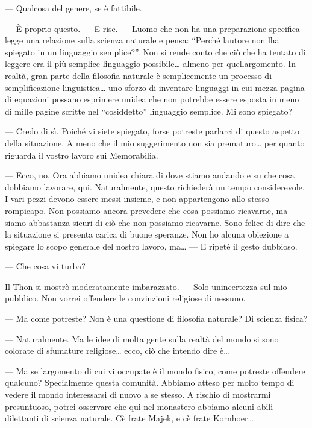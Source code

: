 --- Qualcosa del genere, se è fattibile.

--- È proprio questo. --- E rise. --- L\textquotesingle uomo che non ha
una preparazione specifica legge una relazione sulla scienza naturale e
pensa: ``Perché l\textquotesingle autore non l\textquotesingle ha
spiegato in un linguaggio semplice?''. Non si rende conto che ciò che ha
tentato di leggere era il più semplice linguaggio possibile\ldots{}
almeno per quell\textquotesingle argomento. In realtà, gran parte della
filosofia naturale è semplicemente un processo di semplificazione
linguistica\ldots{} uno sforzo di inventare linguaggi in cui mezza
pagina di equazioni possano esprimere un\textquotesingle idea che non
potrebbe essere esposta in meno di mille pagine scritte nel
``cosiddetto'' linguaggio semplice. Mi sono spiegato?

--- Credo di sì. Poiché vi siete spiegato, forse potreste parlarci di
questo aspetto della situazione. A meno che il mio suggerimento non sia
prematuro\ldots{} per quanto riguarda il vostro lavoro sui Memorabilia.

--- Ecco, no. Ora abbiamo un\textquotesingle idea chiara di dove stiamo
andando e su che cosa dobbiamo lavorare, qui. Naturalmente, questo
richiederà un tempo considerevole. I vari pezzi devono essere messi
insieme, e non appartengono allo stesso rompicapo. Non possiamo ancora
prevedere che cosa possiamo ricavarne, ma siamo abbastanza sicuri di ciò
che non possiamo ricavarne. Sono felice di dire che la situazione si
presenta carica di buone speranze. Non ho alcuna obiezione a spiegare lo
scopo generale del nostro lavoro, ma\ldots{} --- E ripeté il gesto
dubbioso.

--- Che cosa vi turba?

Il Thon si mostrò moderatamente imbarazzato. --- Solo
un\textquotesingle incertezza sul mio pubblico. Non vorrei offendere le
convinzioni religiose di nessuno.

--- Ma come potreste? Non è una questione di filosofia naturale? Di
scienza fisica?

--- Naturalmente. Ma le idee di molta gente sulla realtà del mondo si
sono colorate di sfumature religiose\ldots{} ecco, ciò che intendo dire
è\ldots{}

--- Ma se l\textquotesingle argomento di cui vi occupate è il mondo
fisico, come potreste offendere qualcuno? Specialmente questa comunità.
Abbiamo atteso per molto tempo di vedere il mondo interessarsi di nuovo
a se stesso. A rischio di mostrarmi presuntuoso, potrei osservare che
qui nel monastero abbiamo alcuni abili dilettanti di scienza naturale.
C\textquotesingle è frate Majek, e c\textquotesingle è frate
Kornhoer\ldots{}

